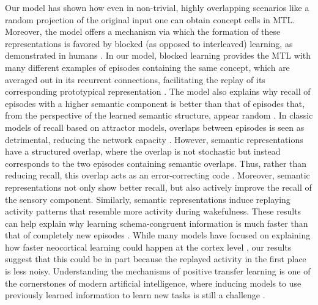 \documentclass{article}
\begin{document}
\newline\newline
Our model has shown how even in non-trivial, highly overlapping scenarios like a random projection of the original input one can obtain concept cells in MTL. Moreover, the model offers a mechanism via which the formation of these representations is favored by blocked (as opposed to interleaved) learning, as demonstrated in humans . In our model, blocked learning provides the MTL with many different examples of episodes containing the same concept, which are averaged out in its recurrent connections, facilitating the replay of its corresponding prototypical representation . The model also explains why recall of episodes with a higher semantic component is better than that of episodes that, from the perspective of the learned semantic structure, appear random . In classic models of recall based on attractor models, overlaps between episodes is seen as detrimental, reducing the network capacity . However, semantic representations have a structured overlap, where the overlap is not stochastic but instead corresponds to the two episodes containing semantic overlaps. Thus, rather than reducing recall, this overlap acts as an error-correcting code . Moreover, semantic representations not only show better recall, but also actively improve the recall of the sensory component. Similarly, semantic representations induce replaying activity patterns that resemble more activity during wakefulness. These results can help explain why learning schema-congruent information is much faster than that of completely new episodes . While many models have focused on explaining how faster neocortical learning could happen at the cortex level , our results suggest that this could be in part because the replayed activity in the first place is less noisy. Understanding the mechanisms of positive transfer learning is one of the cornerstones of modern artificial intelligence, where inducing models to use previously learned information to learn new tasks is still a challenge .
\newline\newline
\end{document}
